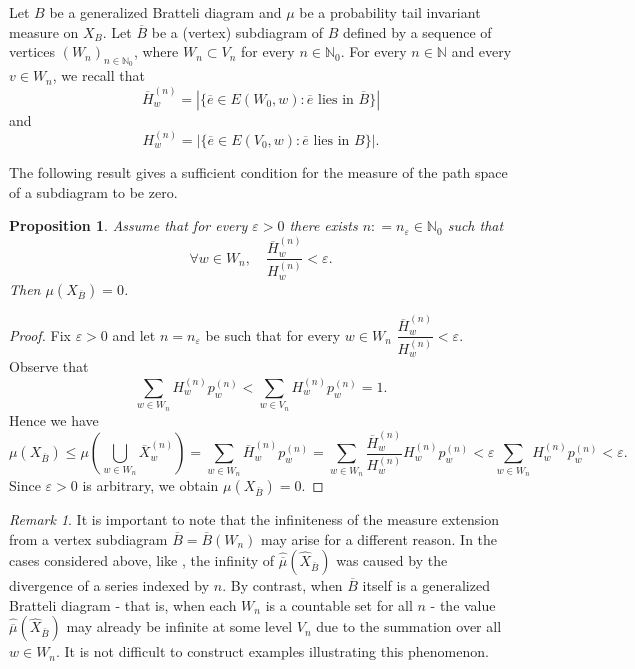 \documentclass[11pt,reqno]{amsart}
\theoremstyle{definition}
\theoremstyle{remark}
\newtheorem{remark}[definition]{Remark}
\theoremstyle{plain}
\newtheorem{prop}[definition]{Proposition}
\def\ol{\overline}
\def\ov{\overline}
\def\wh{\widehat}
\newcommand{\N}{\mathbb N}
\numberwithin{equation}{section}
\begin{document}
Let $B$ be a generalized Bratteli diagram and $\mu$ be a probability tail invariant measure on $X_B$. Let $\ov B$ be a (vertex) subdiagram of $B$ defined by a sequence of vertices $(W_n)_{n \in \N_0}$, where $W_n \subset V_n$ for every $n \in \N_0$. For every $n \in \mathbb{N}$ and every $v \in W_n$, we recall that 
$$
\ov H_w^{(n)} = |\{\ov e \in E(W_0, w): \ov e \mbox{ lies in } \ov B\}|
$$ 
and
$$
H_w^{(n)} = |\{\ov e \in E(V_0, w): \ov e \mbox{ lies in } B\}|.
$$

The following result gives a sufficient condition for the measure of the path space of a subdiagram to be zero.

\begin{prop}
Assume that for every $\varepsilon>0$ there exists $n : = n_{\varepsilon} \in \N_{0}$ such that
$$
\forall w \in W_n, \quad \dfrac{\ov H_w^{(n)}}{H_w^{(n)}} < \varepsilon.
$$
Then $\mu(X_{\overline{B}}) = 0$.
\end{prop}

\begin{proof} Fix $\varepsilon > 0$ and let $n = n_{\varepsilon}$ be such that for every $w \in W_n$ $\dfrac{\ov H_w^{(n)}}{H_w^{(n)}} < \varepsilon$. Observe that
$$
\sum_{w \in W_n} H_w^{(n)} p_w^{(n)} < \sum_{w \in V_n} H_w^{(n)} p_w^{(n)} = 1.$$
Hence we have
$$
\mu(X_{\overline{B}}) \leq \mu(\bigcup_{w \in W_n} \ol X_w^{(n)}) = \sum_{w \in W_n} \ov H_w^{(n)}p_w^{(n)} = \sum_{w \in W_n} \dfrac{\ov H_w^{(n)}}{H_w^{(n)}} H_w^{(n)} p_w^{(n)} < \varepsilon \sum_{w \in W_n} H_w^{(n)} p_w^{(n)} < \varepsilon.
$$ Since $\varepsilon>0
$ is arbitrary, we obtain $\mu(X_{\overline{B}}) = 0$.
\end{proof}

\begin{remark}
It is important to note that the infiniteness of the measure extension from a vertex subdiagram $\ov B = \ov B(W_n)$ may arise for a different reason. In the cases considered above, like 
, the infinity of $\wh{\ol\mu}(\wh X_{\ol B})$ was caused by the divergence of a series indexed by $n$. By contrast, when 
 $\ol B$ itself is a generalized Bratteli diagram - that is, when each $W_n$ is a countable set for all $n$ - the value $\wh{\ol\mu}(\wh X_{\ol B})$ may already be infinite at some level $V_n$ due to the summation over all $w \in W_n$. It is not difficult to construct examples illustrating this phenomenon.
 
\end{remark}
\end{document}
